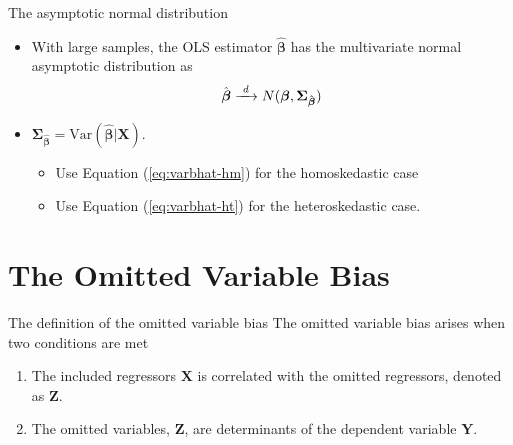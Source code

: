 \documentclass[presentation,10pt]{beamer}
\newcommand{\var}{\mathrm{Var}}
\newcommand{\rarrowd}[1]{\xrightarrow{\text{ \textit #1 }}}
\begin{document}
\begin{frame}[label={sec:orgc1f1b20}]{The asymptotic normal distribution}
\begin{itemize}
\item With large samples, the OLS estimator \(\hat{\boldsymbol{\beta}}\) has the
multivariate normal asymptotic distribution as
\begin{equation}
\label{eq:normal-bhat-m}
\hat{\boldsymbol{\beta}} \rarrowd{d} N(\boldsymbol{\beta}, \boldsymbol{\Sigma_{\hat{\boldsymbol{\beta}}}})
\end{equation}

\item \(\boldsymbol{\Sigma_{\hat{\boldsymbol{\beta}}}} =
  \var(\hat{\boldsymbol{\beta}} | \mathbf{X})\). 
\begin{itemize}
\item Use Equation (\ref{eq:varbhat-hm}) for the homoskedastic case
\item Use Equation (\ref{eq:varbhat-ht}) for the heteroskedastic case.
\end{itemize}
\end{itemize}
\end{frame}

\section{The Omitted Variable Bias}
\label{sec:orgf22afe5}
\setcounter{tocdepth}{1}
\tableofcontents[currentsection]
\begin{frame}[label={sec:org4cd9ef4}]{The definition of the omitted variable bias}
The \alert{omitted variable bias} arises when two conditions are met
\begin{enumerate}
\item The included regressors \(\mathbf{X}\) is correlated with the
omitted regressors, denoted as \(\mathbf{Z}\).
\item The omitted variables, \(\mathbf{Z}\), are determinants of the
dependent variable \(\mathbf{Y}\).
\end{enumerate}
\end{frame}
\end{document}
